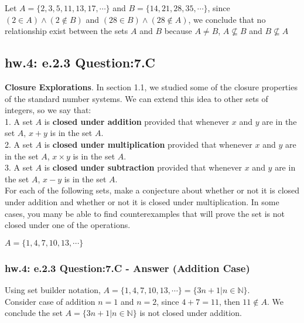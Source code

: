 Let  $ A = \{2, 3, 5, 11, 13, 17, \cdots \}$ and $ B =  \{ 14, 21, 28, 35, \cdots  \}$, since $(2 \in A) \wedge (2 \notin B)$ and $(28 \in B) \wedge (28 \notin A)$, we conclude that no relationship exist between the sets $A$ and $B$ because $A \neq B$, $A \nsubseteq B$ and $B \nsubseteq A$ \\



\subsection{hw.4: e.2.3 Question:7.C}
{\bf Closure Explorations}. In section 1.1, we studied some of the closure properties of the standard number systems. We can extend this idea to other sets of integers, so we say that: \\
1. A set $A$ is {\bf closed under addition} provided that whenever $x$ and $y$ are in the set $A$, $x+y$ is in the set $A$. \\
2. A set $A$ is {\bf closed under multiplication} provided that whenever $x$ and $y$ are in the set $A$, $x\times y$ is in the set $A$. \\
3. A set $A$ is {\bf closed under subtraction} provided that whenever $x$ and $y$ are in the set $A$, $x-y$ is in the set $A$. \\

For each of the following sets, make a conjecture about whether or not it is closed under addition and whether or not it is closed under multiplication. In some cases, you many be able to find counterexamples that will prove the set is not closed under one of the operations. \\

\begin{center}
$A = \{1, 4, 7, 10, 13, \cdots \}$
\end{center}

\subsubsection*{hw.4: e.2.3 Question:7.C - Answer (Addition Case)}
Using set builder notation, $A = \{1, 4, 7, 10, 13, \cdots \} = \{ 3n + 1 | n \in \mathbb{N} \}$. \\
Consider case of addition $n=1$ and $n=2$, since $4+7 = 11$, then $11 \notin A$. We conclude the set $A = \{ 3n + 1 | n \in \mathbb{N} \}$ is not closed under addition. \\

 
 
